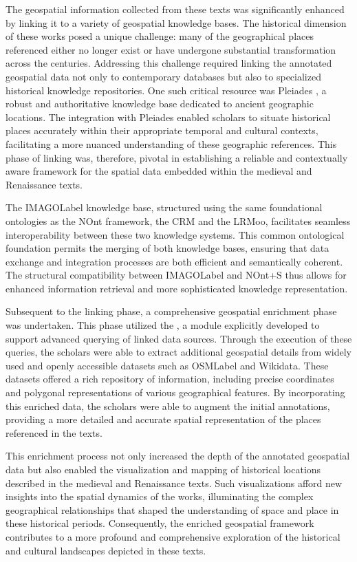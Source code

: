The geospatial information collected from these texts was significantly enhanced by linking it to a variety of geospatial knowledge bases. The historical dimension of these works posed a unique challenge: many of the geographical places referenced either no longer exist or have undergone substantial transformation across the centuries. Addressing this challenge required linking the annotated geospatial data not only to contemporary databases but also to specialized historical knowledge repositories. One such critical resource was Pleiades \cite{simonPleiadesGazetteerPelagios2016}, a robust and authoritative knowledge base dedicated to ancient geographic locations. The integration with Pleiades enabled scholars to situate historical places accurately within their appropriate temporal and cultural contexts, facilitating a more nuanced understanding of these geographic references. This phase of linking was, therefore, pivotal in establishing a reliable and contextually aware framework for the spatial data embedded within the medieval and Renaissance texts.

The \acrshort{IMAGOLabel} knowledge base, structured using the same foundational ontologies as the NOnt framework, the CRM and the LRMoo, facilitates seamless interoperability between these two knowledge systems. This common ontological foundation permits the merging of both knowledge bases, ensuring that data exchange and integration processes are both efficient and semantically coherent. The structural compatibility between \acrshort{IMAGOLabel} and NOnt+S thus allows for enhanced information retrieval and more sophisticated knowledge representation.

Subsequent to the linking phase, a comprehensive geospatial enrichment phase was undertaken. This phase utilized the , a module explicitly developed to support advanced querying of linked data sources. Through the execution of these queries, the scholars were able to extract additional geospatial details from widely used and openly accessible datasets such as \acrshort{OSMLabel} and Wikidata. These datasets offered a rich repository of information, including precise coordinates and polygonal representations of various geographical features. By incorporating this enriched data, the scholars were able to augment the initial annotations, providing a more detailed and accurate spatial representation of the places referenced in the texts.

This enrichment process not only increased the depth of the annotated geospatial data but also enabled the visualization and mapping of historical locations described in the medieval and Renaissance texts. Such visualizations afford new insights into the spatial dynamics of the works, illuminating the complex geographical relationships that shaped the understanding of space and place in these historical periods. Consequently, the enriched geospatial framework contributes to a more profound and comprehensive exploration of the historical and cultural landscapes depicted in these texts.


